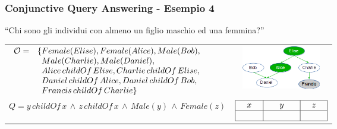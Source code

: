 \documentclass[8pt]{beamer}
\begin{document}
\begin{frame}
\frametitle{Conjunctive Query Answering - Esempio 4}
\begin{center}
``Chi sono gli individui con almeno un figlio maschio ed una femmina?''
\end{center}

\begin{tabular}{lc}
$\begin{array}{cl}
  \Ont  =  &  \{Female(Elise),  Female(Alice), Male(Bob), \\
  &\phantom{\{}Male(Charlie), Male(Daniel), \\
  &\phantom{\{}Alice\,childOf\,Elise, Charlie\,childOf\,Elise, \\
  &\phantom{\{}Daniel\,childOf\,Alice, Daniel\,childOf\,Bob, \\
  &\phantom{\{}Francis\,childOf\,Charlie \}\\
\end{array}$ & \includegraphics[width=130px]{family.png} \\
$Q=y\,childOf\,x\,\wedge\,z\,childOf\,x\,\wedge\,Male(y)\,\wedge\,Female(z)$ &
$\begin{array}{|c|c|c|}
  \hline
  x&y&z\\
  \hline
  \phantom{Elise}&\phantom{Charlie}&\phantom{Alice}\\
  \hline
\end{array}$ \\
\end{tabular}
\end{frame}
\end{document}
